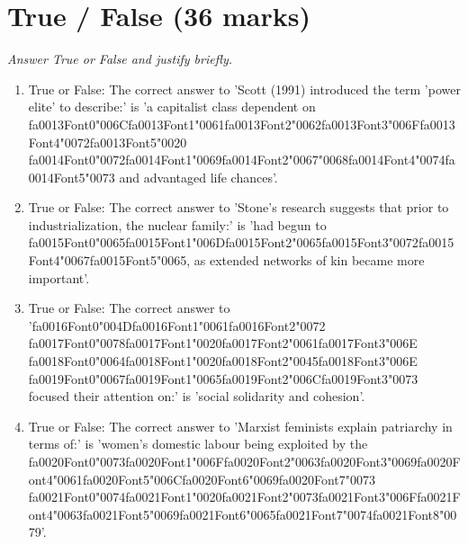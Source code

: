 \documentclass[12pt]{article}
\begin{document}
\section*{True / False (36 marks)}
\textit{Answer True or False and justify briefly.}
\begin{enumerate}[label=\arabic*.]
\item True or False: The correct answer to 'Scott (1991) introduced the term 'power elite' to describe:' is 'a capitalist class dependent on {\csname fa0013Font0\endcsname\char"006C}{\csname fa0013Font1\endcsname\char"0061}{\csname fa0013Font2\endcsname\char"0062}{\csname fa0013Font3\endcsname\char"006F}{\csname fa0013Font4\endcsname\char"0072}{\csname fa0013Font5\endcsname\char"0020} {\csname fa0014Font0\endcsname\char"0072}{\csname fa0014Font1\endcsname\char"0069}{\csname fa0014Font2\endcsname\char"0067}{\char"0068}{\csname fa0014Font4\endcsname\char"0074}{\csname fa0014Font5\endcsname\char"0073} and advantaged life chances'.
\item True or False: The correct answer to 'Stone's research suggests that prior to industrialization, the nuclear family:' is 'had begun to {\csname fa0015Font0\endcsname\char"0065}{\csname fa0015Font1\endcsname\char"006D}{\csname fa0015Font2\endcsname\char"0065}{\csname fa0015Font3\endcsname\char"0072}{\csname fa0015Font4\endcsname\char"0067}{\csname fa0015Font5\endcsname\char"0065}, as extended networks of kin became more important'.
\item True or False: The correct answer to '{\csname fa0016Font0\endcsname\char"004D}{\csname fa0016Font1\endcsname\char"0061}{\csname fa0016Font2\endcsname\char"0072} {\csname fa0017Font0\endcsname\char"0078}{\csname fa0017Font1\endcsname\char"0020}{\csname fa0017Font2\endcsname\char"0061}{\csname fa0017Font3\endcsname\char"006E} {\csname fa0018Font0\endcsname\char"0064}{\csname fa0018Font1\endcsname\char"0020}{\csname fa0018Font2\endcsname\char"0045}{\csname fa0018Font3\endcsname\char"006E} {\csname fa0019Font0\endcsname\char"0067}{\csname fa0019Font1\endcsname\char"0065}{\csname fa0019Font2\endcsname\char"006C}{\csname fa0019Font3\endcsname\char"0073} focused their attention on:' is 'social solidarity and cohesion'.
\item True or False: The correct answer to 'Marxist feminists explain patriarchy in terms of:' is 'women's domestic labour being exploited by the {\csname fa0020Font0\endcsname\char"0073}{\csname fa0020Font1\endcsname\char"006F}{\csname fa0020Font2\endcsname\char"0063}{\csname fa0020Font3\endcsname\char"0069}{\csname fa0020Font4\endcsname\char"0061}{\csname fa0020Font5\endcsname\char"006C}{\csname fa0020Font6\endcsname\char"0069}{\csname fa0020Font7\endcsname\char"0073} {\csname fa0021Font0\endcsname\char"0074}{\csname fa0021Font1\endcsname\char"0020}{\csname fa0021Font2\endcsname\char"0073}{\csname fa0021Font3\endcsname\char"006F}{\csname fa0021Font4\endcsname\char"0063}{\csname fa0021Font5\endcsname\char"0069}{\csname fa0021Font6\endcsname\char"0065}{\csname fa0021Font7\endcsname\char"0074}{\csname fa0021Font8\endcsname\char"0079}'.

\end{enumerate}
\end{document}
